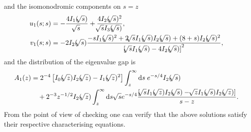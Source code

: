 \documentclass[10pt,reqno]{amsart}
\theoremstyle{plain}
\theoremstyle{definition}
\theoremstyle{remark}
\begin{document}
and the isomonodromic components on $ s=z $
\begin{align}
  u_1(s;s)& = -\frac{4 I_{1}({ \hspace{-0.5pt} \sqrt[]{{s}}})}{{ \hspace{-0.5pt} \sqrt[]{{s}}}}+\frac{4 I_{2}({ \hspace{-0.5pt} \sqrt[]{{s}}})^2}{{ \hspace{-0.5pt} \sqrt[]{{s}}} I_{3}({ \hspace{-0.5pt} \sqrt[]{{s}}})},
\\
  v_1(s;s)& = -2 I_{2}({ \hspace{-0.5pt} \sqrt[]{{s}}}) \frac{-s I_{1}({ \hspace{-0.5pt} \sqrt[]{{s}}})^2+2 { \hspace{-0.5pt} \sqrt[]{{s}}} I_{1}({ \hspace{-0.5pt} \sqrt[]{{s}}}) I_{2}({ \hspace{-0.5pt} \sqrt[]{{s}}})+(8+s) I_{2}({ \hspace{-0.5pt} \sqrt[]{{s}}})^2}
                                      {\left[{ \hspace{-0.5pt} \sqrt[]{{s}}} I_{1}({ \hspace{-0.5pt} \sqrt[]{{s}}})-4 I_{2}({ \hspace{-0.5pt} \sqrt[]{{s}}})\right]^2} ,
\end{align}
and the distribution of the eigenvalue gap is
\begin{align}
  A_1(z) & = 2^{-4}\left[ I_{0}({ \hspace{-0.5pt} \sqrt[]{{z}}})I_{2}({ \hspace{-0.5pt} \sqrt[]{{z}}})-I_{1}({ \hspace{-0.5pt} \sqrt[]{{z}}})^2 \right] \int^{\infty}_{z} {\rm d}s\; e^{-s/4}I_{2}({ \hspace{-0.5pt} \sqrt[]{{s}}}) \notag 
\\ 
& \quad  + 2^{-3}z^{-1/2}I_{2}({ \hspace{-0.5pt} \sqrt[]{{z}}}) \int^{\infty}_{z} {\rm d} s\; { \hspace{-0.5pt} \sqrt[]{{s}}}e^{-s/4}\frac{\left[ { \hspace{-0.5pt} \sqrt[]{{s}}}I_{1}({ \hspace{-0.5pt} \sqrt[]{{z}}})I_{2}({ \hspace{-0.5pt} \sqrt[]{{s}}})-{ \hspace{-0.5pt} \sqrt[]{{z}}}I_{1}({ \hspace{-0.5pt} \sqrt[]{{s}}})I_{2}({ \hspace{-0.5pt} \sqrt[]{{z}}}) \right]}{s-z} .
\end{align}
From the point of view of checking one can verify that the above solutions satisfy their respective 
characterising equations.
\end{document}
